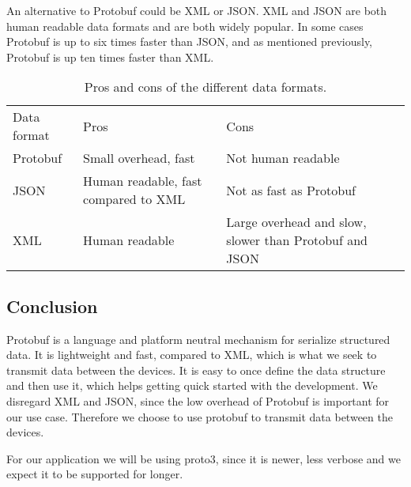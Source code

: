 An alternative to Protobuf could be XML or JSON.
XML and JSON are both human readable data formats and are both widely popular.
In some cases Protobuf is up to six times faster than JSON, and as mentioned previously, Protobuf is up ten times faster than XML\cite{json_slow}.

\begin{table}
    \begin{tabularx}{\textwidth}{XXX}\toprule
        Data format & Pros & Cons \\
        Protobuf    & Small overhead, fast  & Not human readable \\
        JSON        & Human readable, \newline fast compared to XML  & Not as fast as Protobuf\\
        XML         & Human readable        & Large overhead and slow, slower than Protobuf and JSON \\
    \end{tabularx}
    \label{tab:asdf}
    \caption{Pros and cons of the different data formats.}
\end{table}

\subsection{Conclusion}
Protobuf is a language and platform neutral mechanism for serialize structured data.
It is lightweight and fast, compared to XML, which is what we seek to transmit data between the devices.
It is easy to once define the data structure and then use it, which helps getting quick started with the development.
We disregard XML and JSON, since the low overhead of Protobuf is important for our use case.
Therefore we choose to use protobuf to transmit data between the devices.

For our application we will be using proto3, since it is newer, less verbose and we expect it to be supported for longer.

